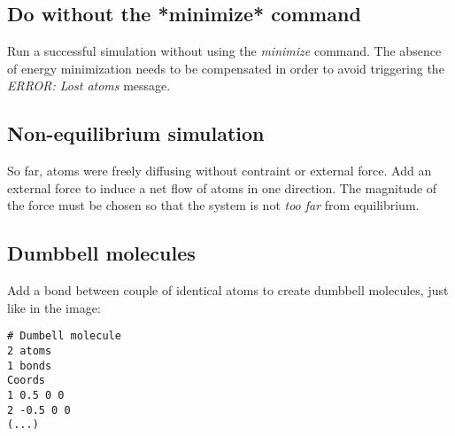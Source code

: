 \subsection{Do without the *minimize* command}

Run a successful simulation without using the \textit{minimize} command.
The absence of energy minimization needs to be compensated
in order to avoid triggering the \textit{ERROR: Lost atoms} message.

\subsection{Non-equilibrium simulation}

So far, atoms were freely diffusing without contraint or external force.
Add an external force to induce a net flow of atoms in one
direction. The magnitude of the force must be chosen so
that the system is not \textit{too far} from equilibrium.

\subsection{Dumbbell molecules}

Add a bond between couple of identical atoms to create
dumbbell molecules, just like in the image:

\begin{verbatim}
# Dumbell molecule
2 atoms
1 bonds
Coords
1 0.5 0 0
2 -0.5 0 0
(...)
\end{verbatim}

